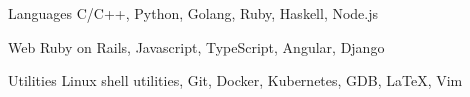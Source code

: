 


\begin{cvskills}


  \cvskill
  {Languages}
  {C/C++, Python, Golang, Ruby, Haskell, Node.js}


  \cvskill
  {Web}
  {Ruby on Rails, Javascript, TypeScript, Angular, Django}


  \cvskill
  {Utilities}
  {Linux shell utilities, Git, Docker, Kubernetes, GDB, \LaTeX, Vim}




\end{cvskills}
